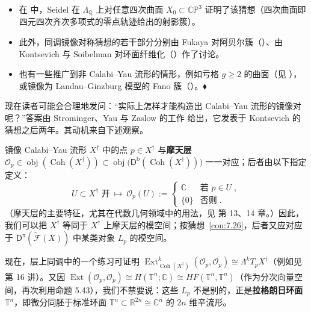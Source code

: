 \begin{Ex}
\begin{itemize}
  \begin{equation}\label{eq:7.117}
  \mathsf D^\pi(\mathcal F(\mathbb T^4))\cong\mathsf D^{\mathrm b}(\operatorname{Coh}(E_A\times E_A))\;,
  \end{equation}
  它可推广为：对任意 $k\in\mathbb Z$，有 $\mathsf D^\pi(\mathcal F(\mathbb T^{2k}))\cong\mathsf D^{\mathrm b}(\operatorname{Coh}(E_A^k))$（并为 Fukaya 范畴的一个无阻碍版本）。
  \item 在 \cite{Sei13} 中，Seidel 在 $\Lambda_{\mathbb Q}$ 上对任意四次曲面 $X_0\subset\mathbb{CP}^3$ 证明了该猜想（四次曲面即四元四次齐次多项式的零点轨迹给出的射影簇）。
  \item 此外，同调镜像对称猜想的若干部分分别由 Fukaya 对阿贝尔簇（\cite{Fuk00}）、由 Kontsevich 与 Soibelman 对环面纤维化（\cite{KS01}）作了讨论。
  \item 也有一些推广到非 Calabi–Yau 流形的情形，例如亏格 $g\ge 2$ 的曲面（见 \cite{Sei11}），或镜像为 Landau–Ginzburg 模型的 Fano 簇（\cite{Aur07}）。\hfill$\blacklozenge$
\end{itemize}
\end{Ex}

现在读者可能会合理地发问：“实际上怎样才能构造出 Calabi–Yau 流形的镜像对呢？”答案由 Strominger、Yau 与 Zaslow 的工作 \cite{SYZ96} 给出，它发表于 Kontsevich 的猜想之后两年。其动机来自下述观察。

\begin{Rem}\label{rem:7.29}
镜像 Calabi–Yau 流形 $X^\dagger$ 中的点 $p\in X^\dagger$ 与\textbf{摩天层} $\mathcal O_p\in\operatorname{obj}(\operatorname{Coh}(X^\dagger))\subset\operatorname{obj}\bigl(\mathsf D^{\mathrm b}(\operatorname{Coh}(X^\dagger))\bigr)$ 一一对应；后者由以下指定定义：
\begin{equation}\label{eq:7.118}
U\subset X^\dagger\text{ 开}\ \longmapsto\ \mathcal O_p(U):=
\begin{cases}
\mathbb C & \text{若 } p\in U\;,\\
\{0\} & \text{否则}\;.
\end{cases}
\end{equation}
（摩天层的主要特征，尤其在代数几何领域中的用法，见 \cite{Gat20} 第 13、14 章。）因此，我们可以把 $X^\dagger$ 等同于 $X^\dagger$ 上摩天层的模空间；按猜想~\ref{con:7.26}，后者又应对应于 $\mathsf D^\pi(\widetilde{\mathcal F}(X))$ 中某类对象 $L_p$ 的模空间。

现在，层上同调中的一个练习可证明 $\operatorname{Ext}^k_{\operatorname{Coh}(X^\dagger)}(\mathcal O_p,\mathcal O_p)\cong\Lambda^kT_pX^\dagger$（例如见 \cite{Aur09} 第 16 讲）。又因 $\operatorname{Ext}(\mathcal O_p,\mathcal O_p)\cong H(\mathbb T^n;\mathbb C)\cong HF(\mathbb T^n,\mathbb T^n)$（作为分次向量空间，再次利用命题 5.43），我们不禁要说：这些 $L_p$ 不是别的，正是\textbf{拉格朗日环面} $\mathbb T^n$，即微分同胚于标准环面 $\mathbb T^n\subset\mathbb R^{2n}\cong\mathbb C^n$ 的 $2n$ 维辛流形。
\end{Rem}


